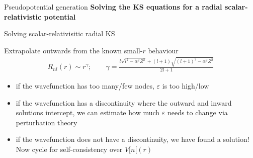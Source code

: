 \documentclass[xcolor=table,aspectratio=169]{beamer}
\numberwithin{equation}{section}
\begin{document}
\begin{frame}{Pseudopotential generation}
   \textbf{Solving the KS equations for a radial scalar-relativistic potential}



\end{frame}
\begin{frame}{Solving scalar-relativisitic radial KS}

   Extrapolate outwards from the known small-$r$ behaviour
   \begin{align*}
      R_{nl}(r) \sim r^\gamma; \qquad \gamma=\frac{l \sqrt{l^2-\alpha^2 Z^2}+(l+1) \sqrt{(l+1)^2-\alpha^2 Z^2}}{2 l+1}
   \end{align*}


   \begin{itemize}[<+(3)->]
      \item if the wavefunction has too many/few nodes, $\varepsilon$ is too high/low
      \item if the wavefunction has a discontinuity where the outward and inward solutions intercept, we can estimate how much $\varepsilon$ needs to change via perturbation theory
      \item if the wavefunction does not have a discontinuity, we have found a solution! Now cycle for self-consistency over $V[n[(r)$
   \end{itemize}

\end{frame}
\end{document}
